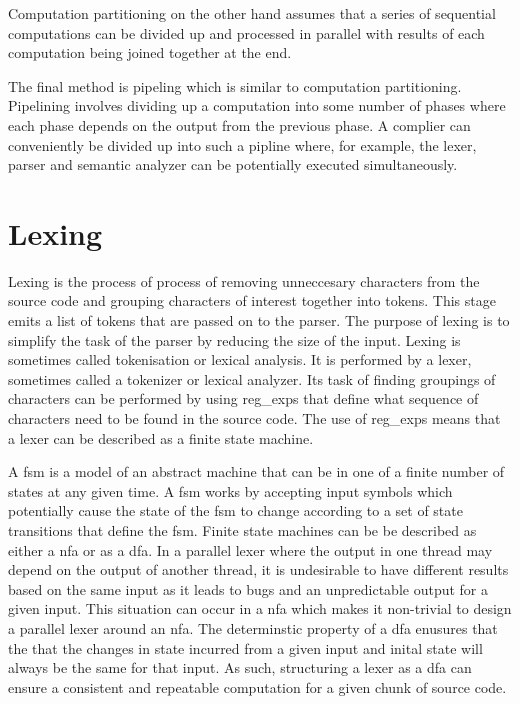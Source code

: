 Computation partitioning on the other hand assumes that a series of sequential
computations can be divided up and processed in parallel with results of
each computation being joined together at the end.

The final method is pipeling which is similar to computation partitioning.
Pipelining involves dividing up a computation into some number of phases
where each phase depends on the output from the previous phase. A complier can
conveniently be divided up into such a pipline where, for example, the lexer,
parser and semantic analyzer can be potentially executed simultaneously. 

\section{Lexing} \label{lit_review_lexing}

Lexing is the process of process of removing unneccesary characters from the
source code and grouping characters of interest together into tokens. This stage
emits a list of tokens that are passed on to the parser. The purpose of lexing
is to simplify the task of the parser by reducing the size of the input. Lexing
is sometimes  called tokenisation or lexical analysis. It is performed by a
lexer, sometimes called a tokenizer or lexical analyzer. Its task of finding
groupings of characters can be performed by using \glspl{reg_exp} that
define what sequence of characters need to be found in the source code. The use
of \glspl{reg_exp} means that a lexer can be described as a finite state
machine.

A \gls{fsm} is a model of an abstract machine that can be in one of a finite
number of states at any given time. A \gls{fsm} works by accepting input symbols
which potentially cause the state of the \gls{fsm} to change according to a set
of state transitions that define the \gls{fsm}. Finite state machines can be
be described as either a \gls{nfa} or as a \gls{dfa}. In a parallel lexer where
the output in one thread may depend on the output of another thread, it is
undesirable to have different results based on the same input as it leads to
bugs and an unpredictable output for a given input. This situation can occur
in a \gls{nfa} which makes it non-trivial to design a parallel lexer around an
\gls{nfa}. The determinstic property of a \gls{dfa} enusures that the that the
changes in state incurred from a given input and inital state will always be
the same for that input. As such, structuring a lexer as a \gls{dfa} can ensure a
consistent and repeatable computation for a given chunk of source code.

